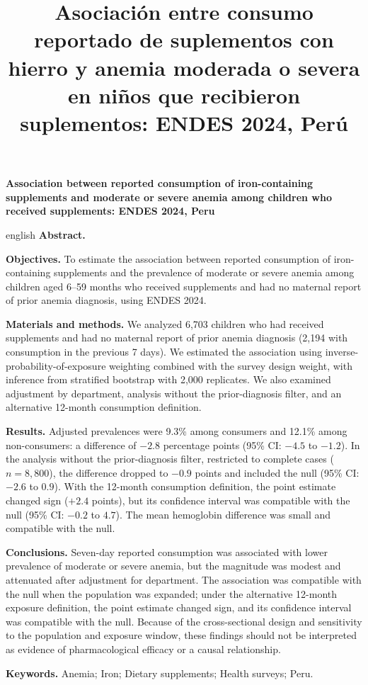 \documentclass[man,11pt,donotrepeattitle,floatsintext]{apa7}
\title{Asociación entre consumo reportado de suplementos con hierro y anemia moderada o severa en niños que recibieron suplementos: ENDES 2024, Perú}
\begin{document}
\maketitle

\vspace{1.0em}
\begin{center}
	\large\textbf{Association between reported consumption of iron-containing supplements and moderate or severe anemia among children who received supplements: ENDES 2024, Peru}
\end{center}
\vspace{0.6em}

\vspace{0.5em}
\begin{otherlanguage*}{english}
\noindent\textbf{Abstract.}

\textbf{Objectives.} To estimate the association between reported consumption of iron-containing supplements and the prevalence of moderate or severe anemia among children aged 6--59 months who received supplements and had no maternal report of prior anemia diagnosis, using ENDES 2024.

\textbf{Materials and methods.} We analyzed 6,703 children who had received supplements and had no maternal report of prior anemia diagnosis (2,194 with consumption in the previous 7 days). We estimated the association using inverse-probability-of-exposure weighting combined with the survey design weight, with inference from stratified bootstrap with 2,000 replicates. We also examined adjustment by department, analysis without the prior-diagnosis filter, and an alternative 12-month consumption definition.

\textbf{Results.} Adjusted prevalences were 9.3\% among consumers and 12.1\% among non-consumers: a difference of $-2.8$ percentage points (95\% CI: $-4.5$ to $-1.2$). In the analysis without the prior-diagnosis filter, restricted to complete cases ($n=8{,}800$), the difference dropped to $-0.9$ points and included the null (95\% CI: $-2.6$ to $0.9$). With the 12-month consumption definition, the point estimate changed sign ($+2.4$ points), but its confidence interval was compatible with the null (95\% CI: $-0.2$ to $4.7$). The mean hemoglobin difference was small and compatible with the null.

\textbf{Conclusions.} Seven-day reported consumption was associated with lower prevalence of moderate or severe anemia, but the magnitude was modest and attenuated after adjustment for department. The association was compatible with the null when the population was expanded; under the alternative 12-month exposure definition, the point estimate changed sign, and its confidence interval was compatible with the null. Because of the cross-sectional design and sensitivity to the population and exposure window, these findings should not be interpreted as evidence of pharmacological efficacy or a causal relationship.

\vspace{0.4em}
\noindent\textbf{Keywords.} Anemia; Iron; Dietary supplements; Health surveys; Peru.
\end{otherlanguage*}
\end{document}

